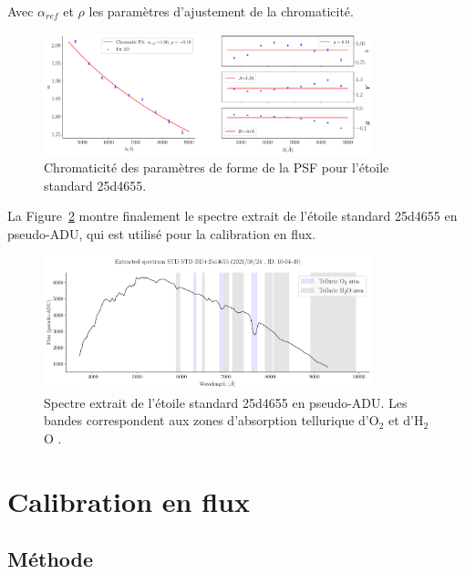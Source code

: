 \documentclass[../main/main.tex]{subfiles}
\begin{document}
Avec $\alpha_{ref}$ et $\rho$ les paramètres d'ajustement de la chromaticité.

\begin{figure}
  \centering
  \includegraphics[width=0.85\textwidth]{../figures/06_irf/chromaticity_psf.pdf}
  \caption[Chromaticité des paramètres de forme de la PSF]{Chromaticité
    des paramètres de forme de la PSF pour l'étoile standard 25d4655.}
  \label{fig:chromaticity_psf}
\end{figure}

La Figure~\ref{fig:stdspectrumadu} montre finalement le spectre extrait de
l'étoile standard 25d4655 en pseudo-ADU, qui est utilisé pour la calibration
en flux. 

\begin{figure}
  \centering
  \includegraphics[width=0.85\textwidth]{../figures/06_irf/stdspectra_adu.pdf}
  \caption[Spectre extrait de l'étoile standard 25d4655 en
  pseudo-ADU.]{Spectre extrait de l'étoile standard 25d4655 en
    pseudo-ADU. Les bandes correspondent aux zones d'absorption
    tellurique d'O$_{2}$ et d'H$_{2}$O \citep{Buton2013}.}
  \label{fig:stdspectrumadu}
\end{figure}


\clearpage
\section{Calibration en flux}\label{sec:validationpsf}

\subsection{Méthode}\label{ssec:photocalibstd}
\end{document}
